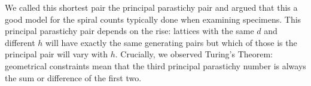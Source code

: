 We called this shortest pair the principal parastichy pair and argued that this a good model for the spiral counts typically done when examining specimens. This principal parastichy pair depends on the rise: lattices with the same $d$ and different $h$ will have exactly the same generating pairs but which of those is the principal pair will vary with $h$. Crucially, we observed Turing's Theorem: geometrical constraints mean that the third principal parastichy number is always the sum or difference of the first two. 

